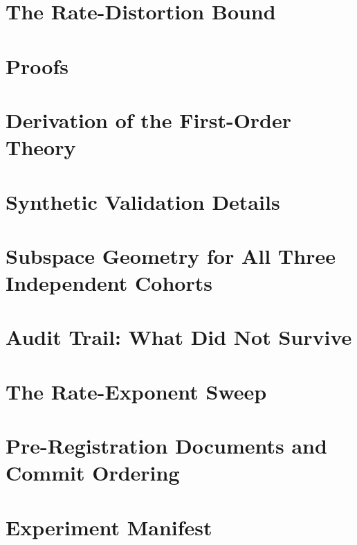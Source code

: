 \ifdefined\FrontmatterAlreadySet

\fi

\ifdefined\TopmatterAlreadySet
\begin{acks}

\end{acks}
\fi

\ifdefined\TopmatterAlreadySet
\printbibliography
\else

\fi

\appendix
\section{The Rate-Distortion Bound}\label{app:rd}\label{sec:lower}\label{sec:lower_bound}\label{sec:achv}\label{sec:achievability}


\section{Proofs}\label{app:proofs}


\section{Derivation of the First-Order Theory}\label{app:drift-theory}


\section{Synthetic Validation Details}\label{app:synthetic}


\section{Subspace Geometry for All Three Independent Cohorts}\label{app:geometry}


\section{Audit Trail: What Did Not Survive}\label{app:audit-trail}


\section{The Rate-Exponent Sweep}\label{app:rate}


\section{Pre-Registration Documents and Commit Ordering}\label{app:prereg}


\section{Experiment Manifest}\label{app:manifest}

